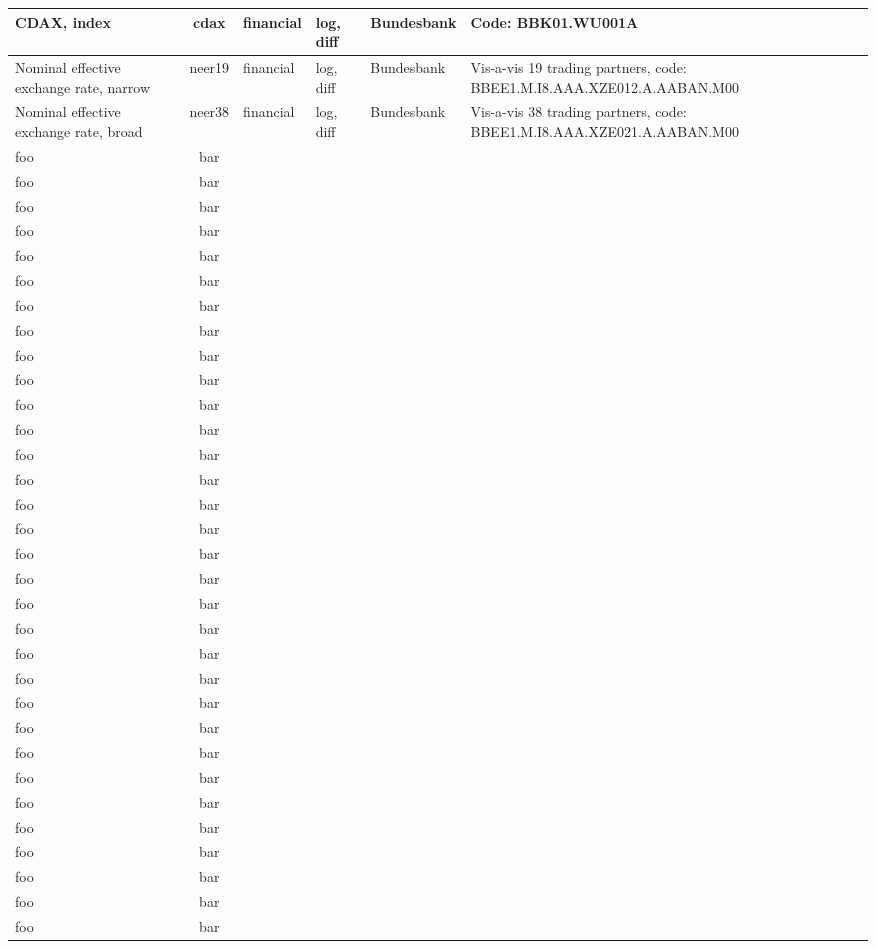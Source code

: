 \documentclass[notitlepage,a4paper,12pt]{article}
\begin{document}
\begin{ThreePartTable}
\begin{landscape}
\begin{longtable}{| l | c | l | l | l | l |}
    CDAX, index & cdax & financial & log, diff & Bundesbank & Code: BBK01.WU001A \\ \hline
    Nominal effective exchange rate, narrow & neer19 & financial & log, diff & Bundesbank & Vis-a-vis 19 trading partners, code: BBEE1.M.I8.AAA.XZE012.A.AABAN.M00 \\ \hline
    Nominal effective exchange rate, broad & neer38 & financial & log, diff & Bundesbank & Vis-a-vis 38 trading partners, code: BBEE1.M.I8.AAA.XZE021.A.AABAN.M00 \\ \hline    foo & bar \\ \hline
    foo & bar \\ \hline
    foo & bar \\ \hline
    foo & bar \\ \hline
    foo & bar \\ \hline 
    foo & bar \\ \hline
    foo & bar \\ \hline
    foo & bar \\ \hline
    foo & bar \\ \hline
    foo & bar \\ \hline
    foo & bar \\ \hline
    foo & bar \\ \hline
    foo & bar \\ \hline
    foo & bar \\ \hline
    foo & bar \\ \hline
    foo & bar \\ \hline 
    foo & bar \\ \hline
    foo & bar \\ \hline
    foo & bar \\ \hline
    foo & bar \\ \hline
    foo & bar \\ \hline
    foo & bar \\ \hline
    foo & bar \\ \hline
    foo & bar \\ \hline
    foo & bar \\ \hline
    foo & bar \\ \hline
    foo & bar \\ \hline 
    foo & bar \\ \hline
    foo & bar \\ \hline
    foo & bar \\ \hline
    foo & bar \\ \hline
    foo & bar \\ \hline

\end{longtable}
\end{landscape}
\end{ThreePartTable}
\end{document}
